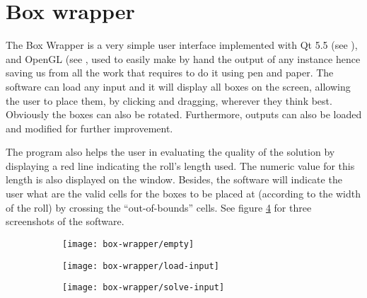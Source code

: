 \section{Box wrapper}
\label{sec:box-wrapper}

The Box Wrapper is a very simple user interface implemented with Qt 5.5
(see \cite{Qt5.5web}), and OpenGL (see \cite{OpenGLWeb}, used to easily
make by hand the output of any instance hence saving us from all the work
that requires to do it using pen and paper. The software can load any input
and it will display all boxes on the screen, allowing the user to place
them, by clicking and dragging, wherever they think best. Obviously the
boxes can also be rotated. Furthermore, outputs can also be loaded and
modified for further improvement.

\hfill

The program also helps the user in evaluating the quality of the solution
by displaying a red line indicating the roll's length used. The numeric
value for this length is also displayed on the window. Besides, the software
will indicate the user what are the valid cells for the boxes to be placed
at (according to the width of the roll) by crossing the ``out-of-bounds''
cells. See figure \ref{fig:box-wrapper-screenshots} for three screenshots
of the software.

\begin{figure}[H]
\centering
	\begin{subfigure}{0.3\textwidth}
		\centering
		\texttt{[image: box-wrapper/empty]}
		\label{fig:box-wrapper-screenshots:A}
	\end{subfigure}
	\begin{subfigure}{0.3\textwidth}
		\centering
		\texttt{[image: box-wrapper/load-input]}
		\label{fig:box-wrapper-screenshots:B}
	\end{subfigure}
	\begin{subfigure}{0.3\textwidth}
		\centering
		\texttt{[image: box-wrapper/solve-input]}
		\label{fig:box-wrapper-screenshots:C}
	\end{subfigure}
	\label{fig:box-wrapper-screenshots}
\end{figure}